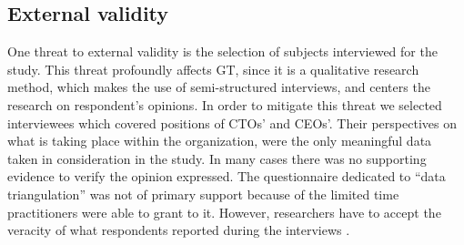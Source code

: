 \documentclass[10pt,journal,letterpaper,compsoc]{IEEEtran}
\begin{document}

\subsection{External validity}
One threat to external validity is the selection of subjects interviewed 
for the study. This threat profoundly affects GT, since it is a qualitative 
research method, which makes the use of semi-structured interviews, and centers 
the research on respondent's opinions. 
In order to mitigate this threat we selected interviewees which 
covered positions of CTOs' and CEOs'. Their perspectives on what is taking 
place within the organization, were the only meaningful data taken in 
consideration in the study.  In many cases there was no supporting evidence to 
verify the opinion expressed. The questionnaire dedicated to ``data 
triangulation'' was not of primary support because of the limited time 
practitioners were able to grant to it. However, researchers have to accept the 
veracity of what respondents reported during the interviews \cite{Coleman2008a}. 
\end{document}
